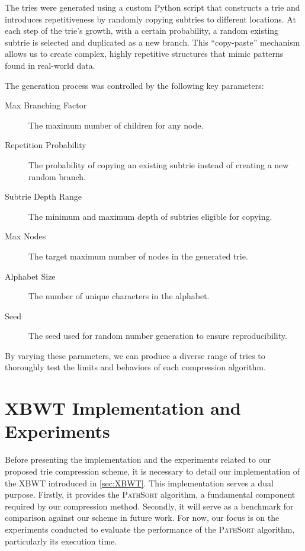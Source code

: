 The tries were generated using a custom Python script that constructs a trie and introduces repetitiveness by randomly copying subtries to different locations. At each step of the trie's growth, with a certain probability, a random existing subtrie is selected and duplicated as a new branch. This ``copy-paste'' mechanism allows us to create complex, highly repetitive structures that mimic patterns found in real-world data.

The generation process was controlled by the following key parameters:
\begin{description}
    \item[Max Branching Factor] The maximum number of children for any node.
    \item[Repetition Probability] The probability of copying an existing subtrie instead of creating a new random branch.
    \item[Subtrie Depth Range] The minimum and maximum depth of subtries eligible for copying.
    \item[Max Nodes] The target maximum number of nodes in the generated trie.
    \item[Alphabet Size] The number of unique characters in the alphabet.
    \item[Seed] The seed used for random number generation to ensure reproducibility.
\end{description}

By varying these parameters, we can produce a diverse range of tries to thoroughly test the limits and behaviors of each compression algorithm.

\section{XBWT Implementation and Experiments}
Before presenting the implementation and the experiments related to our proposed trie compression scheme, it is necessary to detail our implementation of the XBWT introduced in \cref{sec:XBWT}. This implementation serves a dual purpose. Firstly, it provides the \textsc{PathSort} algorithm, a fundamental component required by our compression method. Secondly, it will serve as a benchmark for comparison against our scheme in future work. For now, our focus is on the experiments conducted to evaluate the performance of the \textsc{PathSort} algorithm, particularly its execution time.




